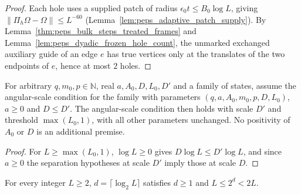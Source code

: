 \begin{proof}\leanok
    Each hole uses a supplied patch of radius $\epsilon_0t\le B_0\log L$, giving $\|\Pi_h\Omega-\Omega\|\le L^{-60}$ (Lemma~\ref{lem:peps_adaptive_patch_supply}). By Lemma~\ref{thm:peps_bulk_steps_treated_frames} and Lemma~\ref{lem:peps_dyadic_frozen_hole_count}, the unmarked exchanged auxiliary guide of an edge $e$ has true vertices only at the translates of the two endpoints of $e$, hence at most $2$ holes.
\end{proof}

\begin{lemma}
    \label{thm:peps_angular_scale_monotonicity}
    \leanok
    For arbitrary $q,m_0,p\in\mathbb N$, real $a,A_0,D,L_0,D'$ and a family of
    states, assume the angular-scale condition for the family with parameters
    $(q,a,A_0,m_0,p,D,L_0)$, $a\ge0$ and $D\le D'$.
    The angular-scale condition then holds with scale $D'$ and threshold
    $\max(L_0,1)$, with all other parameters unchanged. No positivity of
    $A_0$ or $D$ is an additional premise.
\end{lemma}

\begin{proof}\leanok
    For $L\ge\max(L_0,1)$, $\log L\ge0$ gives $D\log L\le D'\log L$, and since $a\ge0$ the separation hypotheses at scale $D'$ imply those at scale $D$.
\end{proof}

\begin{lemma}
    \label{thm:peps_dyadic_padding_bounds}
    \leanok
    For every integer $L\ge2$, $d=\lceil\log_2L\rceil$ satisfies $d\ge1$ and $L\le2^d<2L$.
\end{lemma}

